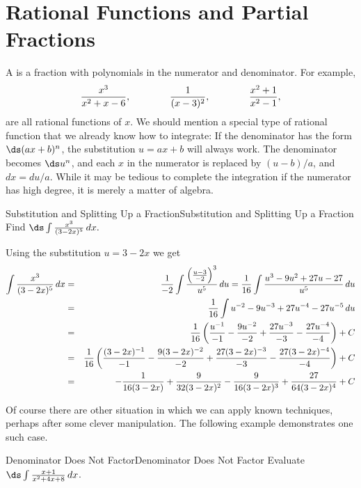\section{Rational Functions and Partial Fractions}{}{}\label{sec:Rational Functions}
A  is a fraction with polynomials in the numerator and
denominator.  For example, 
$$
  {x^3\over x^2+x-6},
  \qquad\qquad
  {1\over (x-3)^2},
  \qquad\qquad
  {x^2+1\over x^2-1},
$$ 
are all rational functions of $x$.  We should mention a special type of rational function that we already know how to integrate: If the denominator has the form $\ds (ax+b)^n$,
the substitution $u=ax+b$ will always work.  The denominator becomes
$\ds u^n$, and each $x$ in the numerator is replaced by $(u-b)/a$, and
$dx=du/a$. While it may be tedious to complete the integration if the
numerator has high degree, it is merely a matter of algebra.

\begin{example}{Substitution and Splitting Up a Fraction}{Substitution and Splitting Up a Fraction}\label{Substitution and Splitting Up a Fraction}
Find $\ds\int{x^3\over(3-2x)^5}\,dx.$ 
\end{example}

\begin{solution}
Using the substitution 
$u=3-2x$ we get
\begin{eqnarray*}
  \int{x^3\over(3-2x)^5}\,dx
  &=&{1\over -2}\int {\left({u-3\over-2}\right)^3\over u^5}\,du
  ={1\over 16}\int {u^3-9u^2+27u-27\over u^5}\,du\cr
  &=&{1\over 16}\int u^{-2}-9u^{-3}+27u^{-4}-27u^{-5}\,du\cr
  &=&{1\over 16}\left({u^{-1}\over-1}-{9u^{-2}\over-2}+{27u^{-3}\over-3}
  -{27u^{-4}\over-4}\right)+C\cr
  &=&{1\over 16}\left({(3-2x)^{-1}\over-1}-{9(3-2x)^{-2}\over-2}+
  {27(3-2x)^{-3}\over-3}
  -{27(3-2x)^{-4}\over-4}\right)+C\cr
  &=&-{1\over
    16(3-2x)}+{9\over32(3-2x)^2}-{9\over16(3-2x)^3}+{27\over64(3-2x)^4}+C
\end{eqnarray*}
\vglue-10pt
\end{solution}



Of course there are other situation in which we can apply known techniques, perhaps after some clever manipulation. The following example demonstrates one such case.

\begin{example}{Denominator Does Not Factor}{Denominator Does Not Factor}\label{Denominator Does Not Factor} 
Evaluate $\ds\int {x+1\over x^2+4x+8}\,dx$. 
\end{example}

